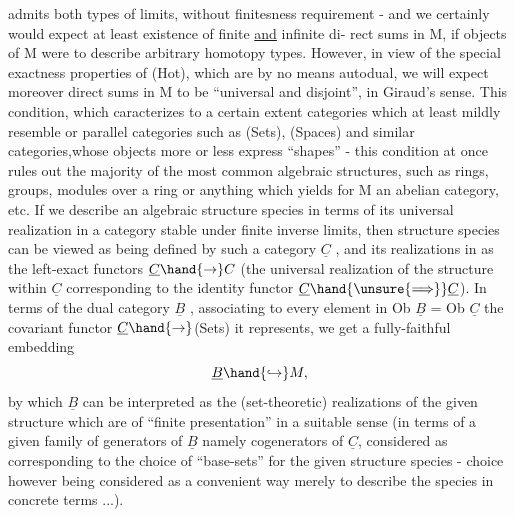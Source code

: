 
admits both types of limits,  without finitesness requirement  -  and
we certainly would expect  at least existence of finite \uline{and} infinite di-%
rect sums in M,  if objects of M were to describe arbitrary homotopy
types.  However,  in view of the special exactness properties of (Hot),
which are by no means autodual,  we will expect moreover direct sums in
M to be ``universal and disjoint'',  in Giraud's sense.  This condition,
which caracterizes to a certain extent categories which at least mildly
resemble or parallel  categories such as (Sets), (Spaces) and similar
categories,whose objects more or less express ``shapes'' -  this condition
at once rules out the majority of the most common algebraic structures,
such as rings,  groups, modules over a ring or anything which
yields for M an abelian category,  etc.  If we describe an algebraic
structure species in terms of its universal realization in a category
stable under finite inverse limits,  then  structure species can be
viewed as being defined by such a category $\underline{C}$ , and its realizations in
  as the left-exact functors $\underline{C}\hand{\to}C$ (the universal realization of the
structure within $\underline{C}$  corresponding to the identity functor $\underline{C}\hand{\unsure{\Longrightarrow}}\underline{C}$).  In
terms of the dual category $\underline{B}$ ,  associating to every element in
Ob $\underline{B}$  =  Ob $\underline{C}$  the covariant functor $\underline{C}\hand{\to}$(Sets) it represents,  we get
a fully-faithful embedding
\[ \underline{B}\hand{\hookrightarrow} M , \]
by which $\underline{B}$ can be interpreted as the  (set-theoretic) realizations of
the given structure  which are of ``finite presentation'' in a suitable
sense (in terms of a given family of generators of $\underline{B}$ namely cogenerators
of $\underline{C}$,  considered as corresponding to the choice of ``base-sets'' for the
given structure species  -   choice however being considered as
a convenient way merely to describe the species in concrete terms ...).
